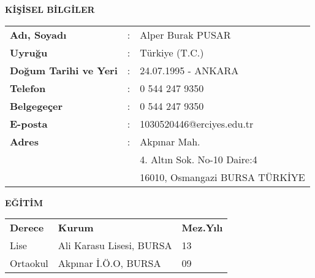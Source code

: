 \textbf{KİŞİSEL BİLGİLER}\\

\renewcommand{\arraystretch}{1.5}
\begin{table*}[h]
	\begin{tabular}{p{2.8cm}ll}
	\textbf{Adı, Soyadı }&: & Alper Burak PUSAR \\
	\textbf{Uyruğu }&: & Türkiye (T.C.)\\
	\textbf{Doğum Tarihi ve Yeri}&: & 24.07.1995 - ANKARA \\
	\textbf{Telefon}& : & 0 544 247 9350 \\ 
	\textbf{Belgegeçer} & : & 0 544 247 9350 \\ 
	\textbf{E-posta} & : &  1030520446@erciyes.edu.tr \\ 
	\textbf{Adres} & : & Akpınar Mah.  \\ 
		&  & 4. Altın Sok. No-10 Daire:4  \\ 
	 & & 16010,  Osmangazi BURSA TÜRKİYE\\
	\end{tabular}
\end{table*}


\textbf{EĞİTİM}\\

\begin{tabular}{lll}
	\textbf{Derece} & \textbf{Kurum} & \textbf{Mez.Yılı}  \\ 
	Lise & Ali Karasu Lisesi, BURSA  & 13  \\ 
	Ortaokul & Akpınar İ.Ö.O, BURSA  & 09 \\


\end{tabular}

\clearpage
